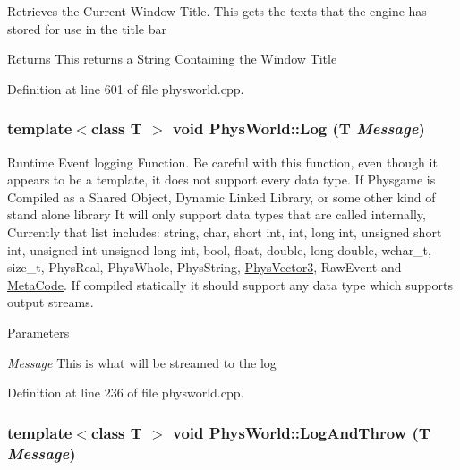 Retrieves the Current Window Title. This gets the texts that the engine has stored for use in the title bar \begin{DoxyReturn}{Returns}
This returns a String Containing the Window Title 
\end{DoxyReturn}


Definition at line 601 of file physworld.cpp.\hypertarget{classPhysWorld_a5e9fead1c3100f5dbd5ca985b82b85ea}{
\subsubsection[{Log}]{\setlength{\rightskip}{0pt plus 5cm}template$<$class T $>$ void PhysWorld::Log (T {\em Message})}}
\label{db/df5/classPhysWorld_a5e9fead1c3100f5dbd5ca985b82b85ea}


Runtime Event logging Function. Be careful with this function, even though it appears to be a template, it does not support every data type. If Physgame is Compiled as a Shared Object, Dynamic Linked Library, or some other kind of stand alone library It will only support data types that are called internally, Currently that list includes: string, char, short int, int, long int, unsigned short int, unsigned int unsigned long int, bool, float, double, long double, wchar\_\-t, size\_\-t, PhysReal, PhysWhole, PhysString, \hyperlink{classPhysVector3}{PhysVector3}, RawEvent and \hyperlink{classMetaCode}{MetaCode}. If compiled statically it should support any data type which supports output streams. 
\begin{DoxyParams}{Parameters}
\item[{\em Message}]This is what will be streamed to the log \end{DoxyParams}


Definition at line 236 of file physworld.cpp.\hypertarget{classPhysWorld_a1c2aeaed2a89821a4545db854da33ab8}{
\subsubsection[{LogAndThrow}]{\setlength{\rightskip}{0pt plus 5cm}template$<$class T $>$ void PhysWorld::LogAndThrow (T {\em Message})}}
\label{db/df5/classPhysWorld_a1c2aeaed2a89821a4545db854da33ab8}


